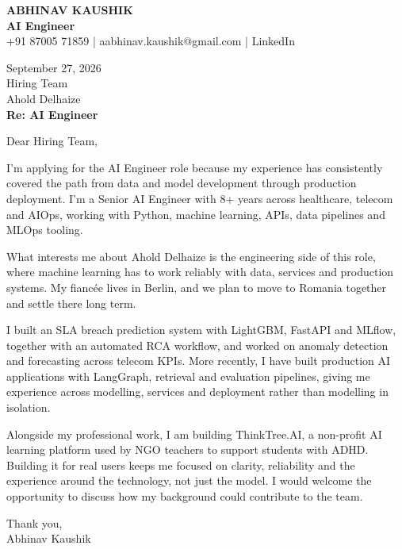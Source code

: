 \documentclass[10pt,a4paper]{article}
\begin{document}
\begin{center}
{\Large\bfseries ABHINAV KAUSHIK}\\[2pt]
{\bfseries AI Engineer}\\[2pt]
+91 87005 71859 \quad | \quad aabhinav.kaushik@gmail.com \quad | \quad LinkedIn
\end{center}
\vspace{8pt}
September 27, 2026\\[6pt]
Hiring Team\\
Ahold Delhaize\\[4pt]
\textbf{Re: AI Engineer}

Dear Hiring Team,

I’m applying for the AI Engineer role because my experience has consistently covered the path from data and model development through production deployment. I’m a Senior AI Engineer with 8+ years across healthcare, telecom and AIOps, working with Python, machine learning, APIs, data pipelines and MLOps tooling.

What interests me about Ahold Delhaize is the engineering side of this role, where machine learning has to work reliably with data, services and production systems. My fiancée lives in Berlin, and we plan to move to Romania together and settle there long term.

I built an SLA breach prediction system with LightGBM, FastAPI and MLflow, together with an automated RCA workflow, and worked on anomaly detection and forecasting across telecom KPIs. More recently, I have built production AI applications with LangGraph, retrieval and evaluation pipelines, giving me experience across modelling, services and deployment rather than modelling in isolation.

Alongside my professional work, I am building ThinkTree.AI, a non-profit AI learning platform used by NGO teachers to support students with ADHD. Building it for real users keeps me focused on clarity, reliability and the experience around the technology, not just the model. I would welcome the opportunity to discuss how my background could contribute to the team.

Thank you,\\
Abhinav Kaushik
\end{document}
